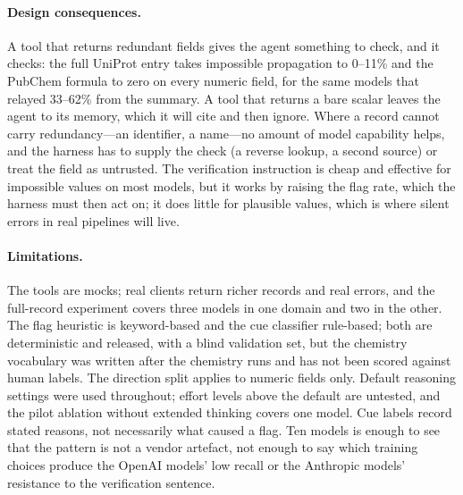 \paragraph{Design consequences.}
A tool that returns redundant fields gives the agent something to check, and it checks: the full UniProt entry takes impossible propagation to 0--11\% and the PubChem formula to zero on every numeric field, for the same models that relayed 33--62\% from the summary. A tool that returns a bare scalar leaves the agent to its memory, which it will cite and then ignore. Where a record cannot carry redundancy---an identifier, a name---no amount of model capability helps, and the harness has to supply the check (a reverse lookup, a second source) or treat the field as untrusted. The verification instruction is cheap and effective for impossible values on most models, but it works by raising the flag rate, which the harness must then act on; it does little for plausible values, which is where silent errors in real pipelines will live.

\paragraph{Limitations.}
The tools are mocks; real clients return richer records and real errors, and the full-record experiment covers three models in one domain and two in the other. The flag heuristic is keyword-based and the cue classifier rule-based; both are deterministic and released, with a blind validation set, but the chemistry vocabulary was written after the chemistry runs and has not been scored against human labels. The direction split applies to numeric fields only. Default reasoning settings were used throughout; effort levels above the default are untested, and the pilot ablation without extended thinking covers one model. Cue labels record stated reasons, not necessarily what caused a flag. Ten models is enough to see that the pattern is not a vendor artefact, not enough to say which training choices produce the OpenAI models' low recall or the Anthropic models' resistance to the verification sentence.
